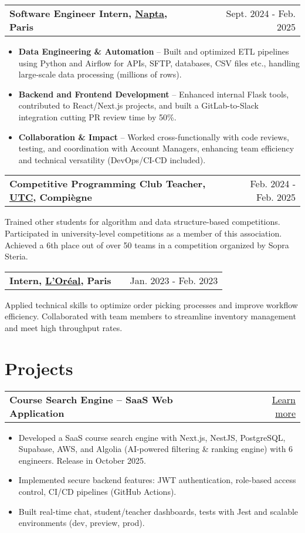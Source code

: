 \documentclass[a4paper,10pt]{article}
\makeatletter
\newenvironment{jobshort}[2]
    {
    \begin{tabularx}{\linewidth}{@{}l X r@{}}
    \textbf{#1} & \hfill &  #2 \\[3.75pt]
    \end{tabularx}
    } {}
\newenvironment{joblong}[2]
    {
    \begin{tabularx}{\linewidth}{@{}l X r@{}}
    \textbf{#1} & \hfill &  #2 \\[3.75pt]
    \end{tabularx}
    \begin{minipage}[t]{\linewidth}
    \begin{itemize}[nosep,after=\strut, leftmargin=1em, itemsep=3pt,label=--]
    }
    {
    \end{itemize}
    \end{minipage}    
    }
\makeatother
\begin{document}
\begin{joblong}{Software Engineer Intern, \href{https://www.napta.io}{Napta}, Paris}{Sept. 2024 - Feb. 2025}
    \item \textbf{Data Engineering \& Automation} – Built and optimized ETL pipelines using Python and Airflow for APIs, SFTP, databases, CSV files etc., handling large-scale data processing (millions of rows).
    \item \textbf{Backend and Frontend Development} – Enhanced internal Flask tools, contributed to React/Next.js projects, and built a GitLab-to-Slack integration cutting PR review time by 50\%.
    \item \textbf{Collaboration \& Impact} – Worked cross-functionally with code reviews, testing, and coordination with Account Managers, enhancing team efficiency and technical versatility (DevOps/CI-CD included).
\end{joblong}

\begin{jobshort}{Competitive Programming Club Teacher, \href{https://www.utc.fr}{UTC}, Compiègne}{Feb. 2024 - Feb. 2025}
    Trained other students for algorithm and data structure-based competitions. Participated in university-level competitions as a member of this association. Achieved a 6th place out of over 50 teams in a competition organized by Sopra Steria.
\end{jobshort}

\begin{jobshort}{Intern, \href{https://www.loreal.com}{L'Oréal}, Paris}{Jan. 2023 - Feb. 2023}
    Applied technical skills to optimize order picking processes and improve workflow efficiency. Collaborated with team members to streamline inventory management and meet high throughput rates.
\end{jobshort}

\section{Projects}

\begin{joblong}{Course Search Engine – SaaS Web Application}{\href{https://mohamedtahiri.com/projects/my-biggest-project}{Learn more}}
    \item Developed a SaaS course search engine with Next.js, NestJS, PostgreSQL, Supabase, AWS, and Algolia (AI-powered filtering \& ranking engine) with 6 engineers. Release in October 2025.
    \item Implemented secure backend features: JWT authentication, role-based access control, CI/CD pipelines (GitHub Actions).
    \item Built real-time chat, student/teacher dashboards, tests with Jest and scalable environments (dev, preview, prod).
\end{joblong}
\end{document}
